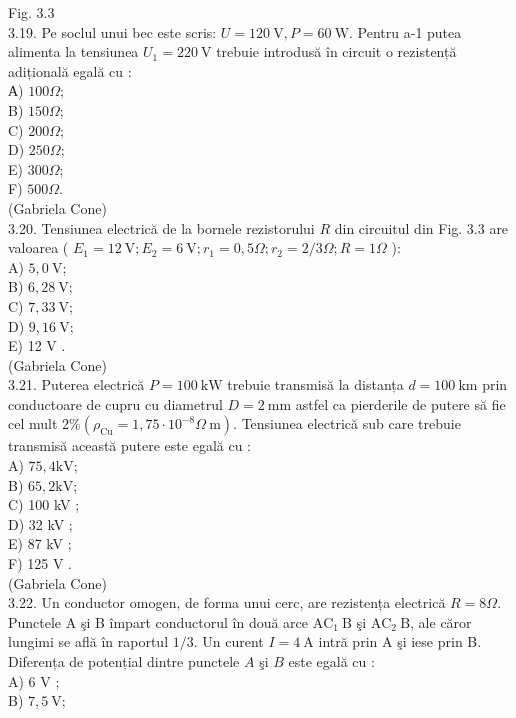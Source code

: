 \documentclass[10pt]{article}
\begin{document}
Fig. 3.3\\
3.19. Pe soclul unui bec este scris: $U=120 \mathrm{~V}, P=60 \mathrm{~W}$. Pentru a-1 putea alimenta la tensiunea $U_{1}=220 \mathrm{~V}$ trebuie introdusă în circuit o rezistență adițională egală cu :\\
А) $100 \Omega$;\\
B) $150 \Omega$;\\
C) $200 \Omega$;\\
D) $250 \Omega$;\\
E) $300 \Omega$;\\
F) $500 \Omega$.\\
(Gabriela Cone)\\
3.20. Tensiunea electrică de la bornele rezistorului $R$ din circuitul din Fig. 3.3 are valoarea ( $E_{1}=12 \mathrm{~V} ; E_{2}=6 \mathrm{~V} ; r_{1}=0,5 \Omega ; r_{2}=2 / 3 \Omega ; R=1 \Omega$ ):\\
A) $5,0 \mathrm{~V}$;\\
B) $6,28 \mathrm{~V}$;\\
C) $7,33 \mathrm{~V}$;\\
D) $9,16 \mathrm{~V}$;\\
E) 12 V .\\
(Gabriela Cone)\\
3.21. Puterea electrică $P=100 \mathrm{~kW}$ trebuie transmisă la distanța $d=100 \mathrm{~km}$ prin conductoare de cupru cu diametrul $D=2 \mathrm{~mm}$ astfel ca pierderile de putere să fie cel mult $2 \%\left(\rho_{\mathrm{Cu}}=1,75 \cdot 10^{-8} \Omega \mathrm{~m}\right)$. Tensiunea electrică sub care trebuie transmisă această putere este egală cu :\\
A) $75,4 \mathrm{kV}$;\\
B) $65,2 \mathrm{kV}$;\\
C) 100 kV ;\\
D) 32 kV ;\\
E) 87 kV ;\\
F) 125 V .\\
(Gabriela Cone)\\
3.22. Un conductor omogen, de forma unui cerc, are rezistența electrică $R=8 \Omega$. Punctele A şi B împart conductorul în două arce $\mathrm{AC}_{1} \mathrm{~B}$ şi $\mathrm{AC}_{2} \mathrm{~B}$, ale căror lungimi se află în raportul $1 / 3$. Un curent $I=4 \mathrm{~A}$ intră prin A şi iese prin B. Diferența de potențial dintre punctele $A$ şi $B$ este egală cu :\\
A) 6 V ;\\
B) $7,5 \mathrm{~V}$;\\
\end{document}
